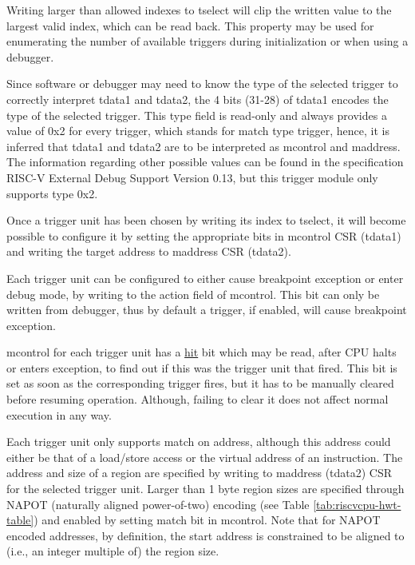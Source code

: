 \documentclass[main\_\_EN.tex]{subfiles}
\begin{document}
Writing larger than allowed indexes to tselect will clip the written value to the largest valid index, which can be read back. This property may be used for enumerating the number of available triggers during initialization or when using a debugger.

Since software or debugger may need to know the type of the selected trigger to correctly interpret tdata1 and tdata2, the 4 bits (31-28) of tdata1 encodes the type of the selected trigger. This type field is read-only and always provides a value of 0x2 for every trigger, which stands for match type trigger, hence, it is inferred that tdata1 and tdata2 are to be interpreted as mcontrol and maddress. The information regarding other possible values can be found in the specification RISC-V External Debug Support Version 0.13, but this trigger module only supports type 0x2.

Once a trigger unit has been chosen by writing its index to tselect, it will become possible to configure it by setting the appropriate bits in mcontrol CSR (tdata1) and writing the target address to maddress CSR (tdata2).

Each trigger unit can be configured to either cause breakpoint exception or enter debug mode, by writing to the action field of mcontrol. This bit can only be written from debugger, thus by default a trigger, if enabled, will cause breakpoint exception.

mcontrol for each trigger unit has a \hyperref[fielddesc:MCONTROLHIT]{hit} bit which may be read, after CPU halts or enters exception, to find out if this was the trigger unit that fired. This bit is set as soon as the corresponding trigger fires, but it has to be manually cleared before resuming operation. Although, failing to clear it does not affect normal execution in any way.

Each trigger unit only supports match on address, although this address could either be that of a load/store access or the virtual address of an instruction. The address and size of a region are specified by writing to maddress (tdata2) CSR for the selected trigger unit. Larger than 1 byte region sizes are specified through NAPOT (naturally aligned power-of-two) encoding (see Table \ref{tab:riscvcpu-hwt-table}) and enabled by setting match bit in mcontrol. Note that for NAPOT encoded addresses, by definition, the start address is constrained to be aligned to (i.e., an integer multiple of) the region size.
\end{document}
